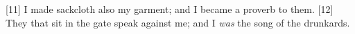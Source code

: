 [11] \textcolor[cmyk]{0.99998,1,0,0}{I made sackcloth also my garment; and I became a proverb to them.}
[12] \textcolor[cmyk]{0.99998,1,0,0}{They that sit in the gate speak against me; and I \emph{was} the song of the drunkards.} %
